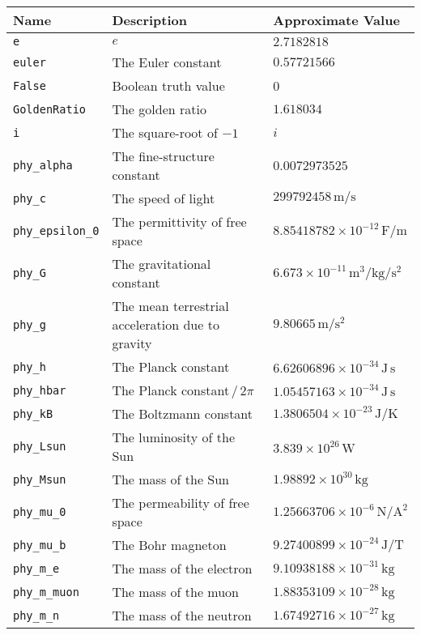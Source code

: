 \begin{landscape}
\begin{center}
\begin{longtable}{|lll|}
\hline \endfoot
\hline
{\bf Name} & {\bf Description} & {\bf Approximate Value} \\ \hline \endhead
{\tt e} & $e$ & $2.7182818$ \\
{\tt euler} & The Euler constant & $0.57721566$ \\
{\tt False} & Boolean truth value & 0 \\
{\tt GoldenRatio} & The golden ratio & $1.618034$ \\
{\tt i} & The square-root of $-1$ & $i$ \\
{\tt phy\_alpha} & The fine-structure constant & $0.0072973525$ \\
{\tt phy\_c} & The speed of light & $299792458\,\mathrm{m}/\mathrm{s}$ \\
{\tt phy\_epsilon\_0} & The permittivity of free space & $8.85418782\times10^{-12}\,\mathrm{F}/\mathrm{m}$ \\
{\tt phy\_G} & The gravitational constant & $6.673\times10^{-11}\,\mathrm{m}^3/\mathrm{kg}/\mathrm{s}^{2}$ \\
{\tt phy\_g} & The mean terrestrial acceleration due to gravity & $9.80665\,\mathrm{m}/\mathrm{s}^{2}$ \\
{\tt phy\_h} & The Planck constant & $6.62606896\times10^{-34}\,\mathrm{J}\,\mathrm{s}$ \\
{\tt phy\_hbar} & The Planck constant$\,/\,2\pi$ & $1.05457163\times10^{-34}\,\mathrm{J}\,\mathrm{s}$ \\
{\tt phy\_kB} & The Boltzmann constant & $1.3806504\times10^{-23}\,\mathrm{J}/\mathrm{K}$ \\
{\tt phy\_Lsun} & The luminosity of the Sun & $3.839\times10^{26}\,\mathrm{W}$ \\
{\tt phy\_Msun} & The mass of the Sun & $1.98892\times10^{30}\,\mathrm{kg}$ \\
{\tt phy\_mu\_0} & The permeability of free space & $1.25663706\times10^{-6}\,\mathrm{N}/\mathrm{A}^{2}$ \\
{\tt phy\_mu\_b} & The Bohr magneton & $9.27400899\times10^{-24}\,\mathrm{J}/\mathrm{T}$ \\
{\tt phy\_m\_e} & The mass of the electron & $9.10938188\times10^{-31}\,\mathrm{kg}$ \\
{\tt phy\_m\_muon} & The mass of the muon & $1.88353109\times10^{-28}\,\mathrm{kg}$ \\
{\tt phy\_m\_n} & The mass of the neutron & $1.67492716\times10^{-27}\,\mathrm{kg}$ \\

\end{longtable}
\end{center}
\end{landscape}
